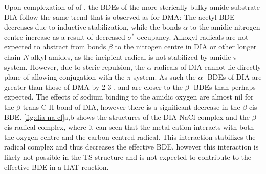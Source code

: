 Upon complexation of  of , the BDEs of the more sterically
bulky amide substrate DIA follow the same trend that is observed as for DMA: The
acetyl  BDE decreases due to inductive stabilization, while the 
bonds $\alpha$ to the amidic nitrogen centre increase as a result of decreased
 $\sigma^*$ occupancy. Alkoxyl radicals are not expected to abstract
from  bonds $\beta$ to the nitrogen centre in DIA or other longer chain
$N$-alkyl amides, as the incipient radical is not stabilized by amidic
$\pi$-system. However, due to steric repulsion, the $\alpha$-radicals of DIA
cannot lie directly plane of allowing conjugation with the $\pi$-system. As such
the $\alpha$- BDEs of DIA are greater than those of DMA by 2-3 \kcalmol,
and are closer to the $\beta$- BDEs than perhaps expected. The effects
of sodium binding to the amidic oxygen are almost nil for the $\beta$-trans C-H
bond of DIA, however there is a significant decrease in the $\beta$-cis 
BDE. \ref{fig:dia-na-cl}a,b shows the structures of the DIA-NaCl complex and the
$\beta$-cis radical complex, where it can seen that the metal cation interacts
with both the oxygen-centre and the carbon-centred radical. This interaction
stabilizes the radical complex and thus decreases the effective BDE, however
this interaction is likely not possible in the TS structure and is not expected
to contribute to the effective BDE in a HAT reaction.

